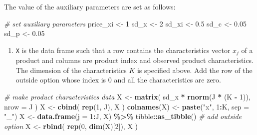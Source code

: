 \documentclass[
]{book}
\newenvironment{Shaded}{\begin{snugshade}}{\end{snugshade}}
\newcommand{\AttributeTok}[1]{\textcolor[rgb]{0.13,0.29,0.53}{#1}}
\newcommand{\CommentTok}[1]{\textcolor[rgb]{0.56,0.35,0.01}{\textit{#1}}}
\newcommand{\DecValTok}[1]{\textcolor[rgb]{0.00,0.00,0.81}{#1}}
\newcommand{\FloatTok}[1]{\textcolor[rgb]{0.00,0.00,0.81}{#1}}
\newcommand{\FunctionTok}[1]{\textcolor[rgb]{0.13,0.29,0.53}{\textbf{#1}}}
\newcommand{\NormalTok}[1]{#1}
\newcommand{\OtherTok}[1]{\textcolor[rgb]{0.56,0.35,0.01}{#1}}
\newcommand{\SpecialCharTok}[1]{\textcolor[rgb]{0.81,0.36,0.00}{\textbf{#1}}}
\newcommand{\StringTok}[1]{\textcolor[rgb]{0.31,0.60,0.02}{#1}}
\providecommand{\tightlist}{%
  \setlength{\itemsep}{0pt}\setlength{\parskip}{0pt}}
\begin{document}
The value of the auxiliary parameters are set as follows:

\begin{Shaded}
\begin{Highlighting}[]
\CommentTok{\# set auxiliary parameters}
\NormalTok{price\_xi }\OtherTok{\textless{}{-}} \DecValTok{1}
\NormalTok{sd\_x }\OtherTok{\textless{}{-}} \DecValTok{2}
\NormalTok{sd\_xi }\OtherTok{\textless{}{-}} \FloatTok{0.5}
\NormalTok{sd\_c }\OtherTok{\textless{}{-}} \FloatTok{0.05}
\NormalTok{sd\_p }\OtherTok{\textless{}{-}} \FloatTok{0.05}
\end{Highlighting}
\end{Shaded}

\begin{enumerate}
\def\labelenumi{\arabic{enumi}.}
\setcounter{enumi}{1}
\tightlist
\item
  \texttt{X} is the data frame such that a row contains the characteristics vector \(x_{j}\) of a product and columns are product index and observed product characteristics. The dimension of the characteristics \(K\) is specified above. Add the row of the outside option whose index is \(0\) and all the characteristics are zero.
\end{enumerate}

\begin{Shaded}
\begin{Highlighting}[]
\CommentTok{\# make product characteristics data}
\NormalTok{X }\OtherTok{\textless{}{-}} 
  \FunctionTok{matrix}\NormalTok{(}
\NormalTok{       sd\_x }\SpecialCharTok{*} \FunctionTok{rnorm}\NormalTok{(J }\SpecialCharTok{*}\NormalTok{ (K }\SpecialCharTok{{-}} \DecValTok{1}\NormalTok{)), }
       \AttributeTok{nrow =}\NormalTok{ J}
\NormalTok{       )}
\NormalTok{X }\OtherTok{\textless{}{-}} 
  \FunctionTok{cbind}\NormalTok{(}
       \FunctionTok{rep}\NormalTok{(}\DecValTok{1}\NormalTok{, J),}
\NormalTok{       X}
\NormalTok{       )}
\FunctionTok{colnames}\NormalTok{(X) }\OtherTok{\textless{}{-}} \FunctionTok{paste}\NormalTok{(}\StringTok{"x"}\NormalTok{, }\DecValTok{1}\SpecialCharTok{:}\NormalTok{K, }\AttributeTok{sep =} \StringTok{"\_"}\NormalTok{)}
\NormalTok{X }\OtherTok{\textless{}{-}} 
  \FunctionTok{data.frame}\NormalTok{(}\AttributeTok{j =} \DecValTok{1}\SpecialCharTok{:}\NormalTok{J, X) }\SpecialCharTok{\%\textgreater{}\%}
\NormalTok{  tibble}\SpecialCharTok{::}\FunctionTok{as\_tibble}\NormalTok{()}
\CommentTok{\# add outside option}
\NormalTok{X }\OtherTok{\textless{}{-}} 
  \FunctionTok{rbind}\NormalTok{(}
  \FunctionTok{rep}\NormalTok{(}\DecValTok{0}\NormalTok{, }\FunctionTok{dim}\NormalTok{(X)[}\DecValTok{2}\NormalTok{]),}
\NormalTok{  X}
\NormalTok{  ) }
\end{Highlighting}
\end{Shaded}
\end{document}
